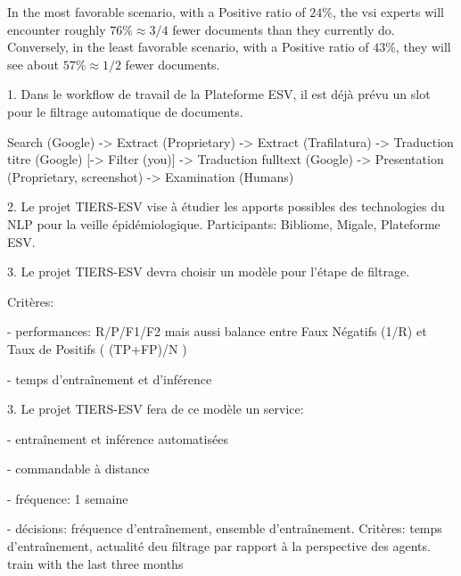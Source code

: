 In the most favorable scenario, with a Positive ratio of $24\%$, the \gls{vsi} experts will encounter roughly $76\% \approx 3/4$ fewer documents than they currently do. Conversely, in the least favorable scenario, with a Positive ratio of $43\%$, they will see about $57\% \approx 1/2$ fewer documents.




\clearpage




\iffalse


1. Dans le workflow de travail de la Plateforme ESV, il est déjà prévu un slot pour le filtrage automatique de documents.


    Search (Google) -> Extract (Proprietary) -> Extract (Trafilatura) -> Traduction titre (Google) [-> Filter (you)] -> Traduction fulltext (Google) -> Presentation (Proprietary, screenshot) -> Examination (Humans)


2. Le projet TIERS-ESV vise à étudier les apports possibles des technologies du NLP pour la veille épidémiologique. Participants: Bibliome, Migale, Plateforme ESV.


3. Le projet TIERS-ESV devra choisir un modèle pour l'étape de filtrage.

Critères:

    - performances: R/P/F1/F2 mais aussi balance entre Faux Négatifs (1/R) et Taux de Positifs ( (TP+FP)/N )

    - temps d'entraînement et d'inférence


3. Le projet TIERS-ESV fera de ce modèle un service:

    - entraînement et inférence automatisées
    
    - commandable à distance

    - fréquence: 1 semaine

    - décisions: fréquence d'entraînement, ensemble d'entraînement. Critères: temps d’entraînement, actualité deu filtrage par rapport à la perspective des agents. train with the last three months


